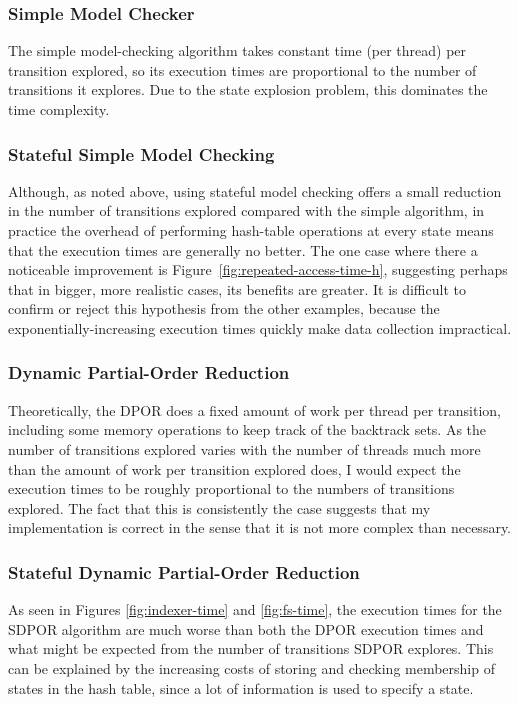 \documentclass[12pt,a4paper,twoside,openright]{report}
\begin{document}
\subsubsection{Simple Model Checker}
The simple model-checking algorithm takes
constant time (per thread) per transition
explored, so its execution times are
proportional to the number of transitions it
explores. Due to the state explosion problem,
this dominates the time complexity.

\subsubsection{Stateful Simple Model Checking}
Although, as noted above, using stateful model
checking offers a small reduction in the number
of transitions explored compared with the simple
algorithm, in practice the overhead of
performing hash-table operations at every state
means that the execution times are
generally no better. The one
case where there a noticeable
improvement is
Figure~\ref{fig:repeated-access-time-h},
suggesting perhaps that in bigger, more
realistic cases, its benefits are greater.
It is difficult to confirm
or reject this hypothesis from the other examples,
because the exponentially-increasing execution times
quickly make data collection impractical.

\subsubsection{Dynamic Partial-Order Reduction}
Theoretically, the DPOR does a fixed amount of
work per thread per transition, including some
memory operations to keep track of the backtrack
sets. As the number of transitions explored
varies with
the number of threads much more than the amount
of work per transition explored does, I would
expect the execution times to be roughly
proportional to the numbers of transitions
explored. The fact that this is consistently
the case suggests that my
implementation is correct
in the sense that it is not more
complex than necessary.

\subsubsection{Stateful Dynamic Partial-Order Reduction}
As seen in Figures
\ref{fig:indexer-time} and \ref{fig:fs-time},
the execution times for the SDPOR algorithm
are much worse than both the DPOR execution
times and what might be
expected from the number of
transitions SDPOR explores.
This can be explained by the increasing
costs of storing and checking membership
of states in the hash table, since a lot
of information is used to specify a state.
\end{document}
